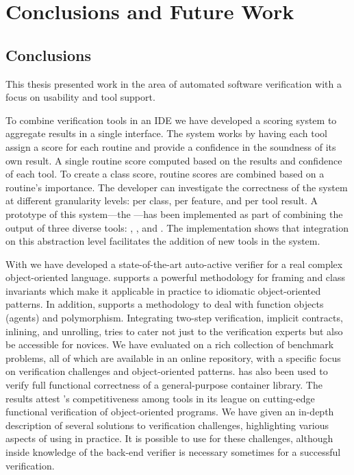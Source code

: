 \chapter{Conclusions and Future Work}
\label{sec:concl_fut}

\section{Conclusions}
\label{sec:conclusions}

This thesis presented work in the area of automated software verification with a focus on usability and tool support.

To combine verification tools in an IDE we have developed a scoring system to aggregate results in a single interface.
The system works by having each tool assign a score for each routine and provide a confidence in the soundness of its own result.
A single routine score computed based on the results and confidence of each tool.
To create a class score, routine scores are combined based on a routine's importance.
The developer can investigate the correctness of the system at different granularity levels: per class, per feature, and per tool result.
A prototype of this system---the \VAssist---has been implemented as part of \EVE combining the output of three diverse tools: \AutoProof, \AutoTest, and \Inspector.
The implementation shows that integration on this abstraction level facilitates the addition of new tools in the system.

With \AutoProof we have developed a state-of-the-art auto-active verifier for a real complex object-oriented language.
\AutoProof supports a powerful methodology for framing and class invariants which make it applicable in practice to idiomatic object-oriented patterns.
In addition, \AutoProof supports a methodology to deal with function objects (agents) and polymorphism.
Integrating two-step verification, implicit contracts, inlining, and unrolling, \AutoProof tries to cater not just to the verification experts but also be accessible for novices.
We have evaluated \AutoProof on a rich collection of benchmark problems, all of which are available in an online repository, with a specific focus on verification challenges and object-oriented patterns.
\AutoProof has also been used to verify full functional correctness of a general-purpose container library.
The results attest \AutoProof's competitiveness among tools in its league on cutting-edge functional verification of object-oriented programs.
We have given an in-depth description of several solutions to verification challenges, highlighting various aspects of using \AutoProof in practice.
It is possible to use \AutoProof for these challenges, although inside knowledge of the back-end verifier is necessary sometimes for a successful verification.

